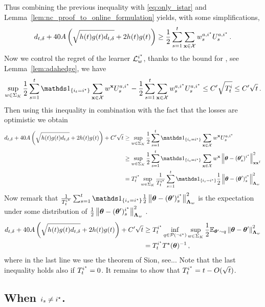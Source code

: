 Thus combining the previous inequality with \eqref{eq:only_istar} and Lemma~\ref{lem:nc_proof_to_online_formulation} yields, with some simplifications,
\begin{equation}
\label{eq:to_UCB}
d_{t,\delta} + 40 A\left(\sqrt{h(t)g(t) d_{t,\delta}}+ 2h(t)g(t)\right) \geq \frac{1}{2}\sum_{s=1}^t\sum_{{\bf x}\in\mathcal{X}} w_s^{a,i^\star}U_s^{a,i^\star}\,.
\end{equation}
Now we control the regret of the learner $\mathcal{L}_w^{i^\star}$, thanks to the bound for \AH, see Lemma~\ref{lem:adahedge}, we have
\[
\sup_{w\in\Sigma_K}\frac{1}{2}\sum_{s=1}^t\ind_{\{i_t = \istar\}}\sum_{\bx\in\cX} w^{\bx}U_s^{a,\istar} -\frac{1}{2}\sum_{s=1}^t\sum_{\bx\in\cX} w_s^{a,\istar}U_s^{a,\istar} \leq C'\sqrt{T_t^i}\leq C'\sqrt{t}\,.
\]
Then using this inequality in combination with the fact that the losses are optimistic we obtain
\begin{align*}
  d_{t,\delta} + 40 A\left(\sqrt{h(t)g(t) d_{t,\delta}}+ 2h(t)g(t)\right) +C'\sqrt{t}
  &\geq \sup_{w\in\Sigma_K}\frac{1}{2}\sum_{s=1}^t\ind_{\{i_s = \istar\}}\sum_{\bx\in\cX} w^{\bx}U_s^{a,\istar}
  \\
  &\geq \sup_{w\in\Sigma_K}\frac{1}{2}\sum_{s=1}^t\ind_{\{i_s = \istar\}}\sum_{\bx\in\cX} w^{\bx} \normm{\btheta -(\btheta'_s)^{\istar}}^2_{\bx\bx\transpose}
  \\
  &= T^{\istar}_t \sup_{w\in\Sigma_K}\frac{1}{T^{i^*}_t}\sum_{s=1}^t\ind_{\{i_s = \istar\}}\frac{1}{2}\normm{\btheta -(\btheta')_s^{\istar}}^2_{\bLambda_{w}}
  \end{align*}
Now remark that $\frac{1}{T^{i^\star}_t}\sum_{s=1}^t\ind_{\{i_s = \istar\}}\frac{1}{2}\normm{\btheta -(\btheta')_s^{\istar}}^2_{\bLambda_{w}}$ is the expectation under some distribution of $\frac{1}{2}\left\lVert{\boldsymbol \theta} -({\boldsymbol \theta}')_s^{i^\star}\right\rVert^2_{{\boldsymbol \Lambda}_{w}}$ .
\begin{align*}
  d_{t,\delta} + 40 A\left(\sqrt{h(t)g(t) d_{t,\delta}}+ 2h(t)g(t)\right) +C'\sqrt{t}
  &\geq T^{i^\star}_t \inf_{q\in\mathcal{P}(\neg i^\star)} \sup_{w\in\Sigma_K}\frac{1}{2}\mathbb{E}_{{\boldsymbol \theta}'\sim q}\left\lVert{\boldsymbol \theta} -{\boldsymbol \theta}'\right\rVert^2_{{\boldsymbol \Lambda}_{w}}\\
 &=T^{i^\star}_t T^{\star}({\boldsymbol \theta})^{-1}\,,
\end{align*}
where in the last line we use the theorem of Sion, see...%
Note that the last inequality holds also if $T_t^{i^\star} = 0$. It remains to show that $T^{i^\star}_t = t- O(\sqrt{t})$.

\subsection{When $i_s \neq i^\star$.}

